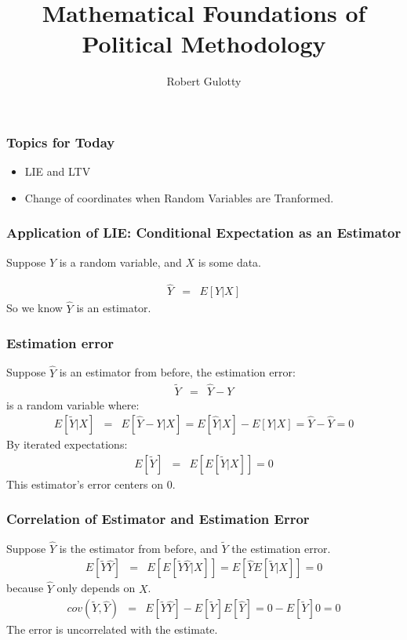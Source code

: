 \documentclass{beamer}
\title[PLSC 43401]{Mathematical Foundations of Political Methodology}
\author{Robert Gulotty}
\institute[Chicago]{University of Chicago}
\numberwithin{equation}{section}
\begin{document}
\begin{frame}
\maketitle
\end{frame}





\begin{frame}
\frametitle{Topics for Today}
\begin{itemize}
\item LIE and LTV
\item Change of coordinates when Random Variables are Tranformed.
\end{itemize}
\end{frame}


\begin{frame}
\frametitle{Application of LIE: Conditional Expectation as an Estimator}
Suppose $Y$ is a random variable, and $X$ is some data.

\begin{eqnarray}
\hat{Y} & = & E[Y|X] \nonumber 
\end{eqnarray}\pause
So we know $\hat{Y}$ is an estimator.\\


\end{frame}


\begin{frame}
\frametitle{Estimation error}
Suppose $\hat{Y}$ is an estimator from before, the estimation error:
\begin{eqnarray}
\tilde{Y} & = & \hat{Y}-Y \nonumber 
\end{eqnarray}\pause
is a random variable where:
\begin{eqnarray}
E[\tilde{Y}|X] & = & E[ \hat{Y}-Y|X]=E[ \hat{Y}|X]-E[Y|X]=\hat{Y} -\hat{Y} =0\nonumber 
\end{eqnarray}\pause
By iterated expectations:\pause
\begin{eqnarray}
E[\tilde{Y}] & = & E[E[ \tilde{Y}|X]]=0 \nonumber 
\end{eqnarray}\pause
This estimator's error centers on 0.

\end{frame}


\begin{frame}
\frametitle{Correlation of  Estimator and Estimation Error}
Suppose $\hat{Y}$ is the estimator from before, and $\tilde{Y}$ the estimation error.
\begin{eqnarray}
E[\tilde{Y}\hat{Y}] & = & E[E[\tilde{Y}\hat{Y}|X]]=E[\hat{Y}E[\tilde{Y}|X]]=0 \nonumber 
\end{eqnarray}\pause
because $\hat{Y}$ only depends on $X$.\pause
\begin{eqnarray}
cov(\tilde{Y},\hat{Y}) & = & E[ \tilde{Y}\hat{Y}]-E[\tilde{Y}]E[\hat{Y}]=0- E[\tilde{Y}]0=0\nonumber 
\end{eqnarray}\pause
The error is uncorrelated with the estimate. 
\end{frame}
\end{document}
